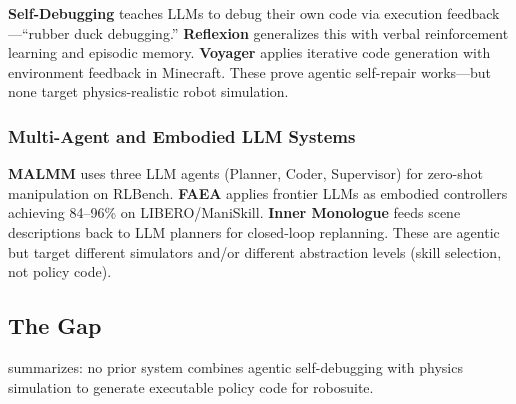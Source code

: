 \documentclass[11pt]{article}
\begin{document}
\textbf{Self-Debugging} \citep{olausson2024selfrepair} teaches LLMs to debug their own code via execution feedback---``rubber duck debugging.'' \textbf{Reflexion} \citep{shinn2023reflexion} generalizes this with verbal reinforcement learning and episodic memory. \textbf{Voyager} \citep{voyager2023} applies iterative code generation with environment feedback in Minecraft. These prove agentic self-repair works---but none target physics-realistic robot simulation.

\subsubsection{Multi-Agent and Embodied LLM Systems}

\textbf{MALMM} \citep{malmm2025} uses three LLM agents (Planner, Coder, Supervisor) for zero-shot manipulation on RLBench. \textbf{FAEA} \citep{faea2025} applies frontier LLMs as embodied controllers achieving 84--96\% on LIBERO/ManiSkill. \textbf{Inner Monologue} \citep{huang2022inner} feeds scene descriptions back to LLM planners for closed-loop replanning. These are agentic but target different simulators and/or different abstraction levels (skill selection, not policy code).

\subsection{The Gap}

 summarizes: no prior system combines agentic self-debugging with physics simulation to generate executable policy code for robosuite.
\end{document}
